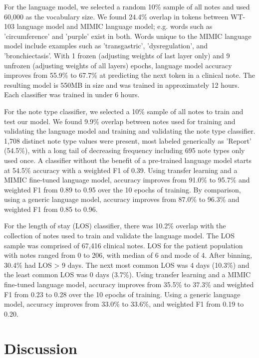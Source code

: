 \documentclass{amia}
\begin{document}
For the language model, we selected a random 10\% sample of all notes and used 60,000 as the vocabulary size. We found 24.4\% overlap in tokens between WT-103 language model and MIMIC language model; e.g. words such as 'circumference' and 'purple' exist in both. Words unique to the MIMIC language model include examples such as 'transgastric', 'dysregulation', and 'bronchiectasis'. With 1 frozen (adjusting weights of last layer only) and 9 unfrozen (adjusting weights of all layers) epochs, language model accuracy improves from 55.9\% to 67.7\% at predicting the next token in a clinical note. The resulting model is 550MB in size and was trained in approximately 12 hours. Each classifier was trained in under 6 hours.

For the note type classifier, we selected a 10\% sample of all notes to train and test our model. We found 9.9\% overlap between notes used for training and validating the language model and training and validating the note type classifier. 1,708 distinct note type values were present, most labeled generically as 'Report' (54.5\%), with a long tail of decreasing frequency including 695 note types only used once. A classifier without the benefit of a pre-trained language model starts at 54.5\% accuracy with a weighted F1 of 0.39. Using transfer learning and a MIMIC fine-tuned language model, accuracy improves from 91.0\% to 95.7\% and weighted F1 from 0.89 to 0.95 over the 10 epochs of training. By comparison, using a generic language model, accuracy improves from 87.0\% to 96.3\% and weighted F1 from 0.85 to 0.96.

For the length of stay (LOS) classifier, there was 10.2\% overlap with the collection of notes used to train and validate the language model. The LOS sample was comprised of 67,416 clinical notes. LOS for the patient population with notes ranged from 0 to 206, with median of 6 and mode of 4. After binning, 30.4\% had LOS > 9 days. The next most common LOS was 4 days (10.3\%) and the least common LOS was 0 days (3.7\%). Using transfer learning and a MIMIC fine-tuned language model, accuracy improves from 35.5\% to 37.3\% and weighted F1 from 0.23 to 0.28 over the 10 epochs of training. Using a generic language model, accuracy improves from 33.0\% to 33.6\%, and weighted F1 from 0.19 to 0.20.

\section*{Discussion}
\end{document}

